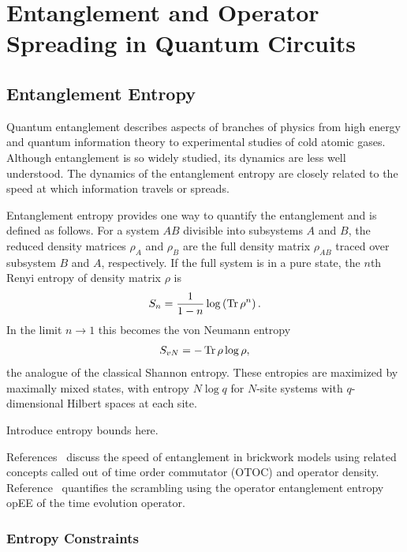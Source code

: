 \section{Entanglement and Operator Spreading in Quantum Circuits} \label{sec:circuits}

\subsection{Entanglement Entropy} \label{sub:intro}\emph{}

Quantum entanglement describes aspects of branches of physics from high energy and quantum information theory to experimental studies of cold atomic gases. Although entanglement is so widely studied, its dynamics are less well understood. The dynamics of the entanglement entropy are closely related to the speed at which information travels or spreads. 

Entanglement entropy provides one way to quantify the entanglement and is defined as follows. For a system $AB$ divisible into subsystems $A$ and $B$, the reduced density matrices $\rho_A$ and $\rho_B$ are the full density matrix $\rho_{AB}$ traced over subsystem $B$ and $A$, respectively. If the full system is in a pure state, the $n$th Renyi entropy of density matrix $\rho$ is 
\begin{align}
S_n = \frac{1}{1-n}\log\left(\operatorname{Tr}\rho^n\right). \label{eqn:renyi}
\end{align}
In the limit $n\to1$ this becomes the von Neumann entropy
\begin{align}
S_{vN} = -\operatorname{Tr}\rho\log\rho,
\end{align}
the analogue of the classical Shannon entropy. These entropies are maximized by maximally mixed states, with entropy $N\log q$ for $N$-site systems with $q$-dimensional Hilbert spaces at each site.

Introduce entropy bounds here.

References~\cite{Keyserlingk, Jonay} discuss the speed of entanglement in brickwork models using related concepts called out of time order commutator (OTOC) and operator density. Reference~\cite{Zhou2017} quantifies the scrambling using the operator entanglement entropy opEE of the time evolution operator.

\subsubsection{Entropy Constraints} \emph{ }\label{subsub:constraints}

